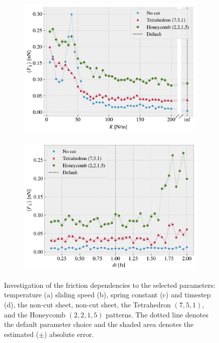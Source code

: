 \begin{figure}[!htb]
\begin{subfigure}[t]{0.49\textwidth}
      \centering
      \includegraphics[width=\textwidth]{figures/baseline/variables_spring_mean_fixmove.pdf}
      \caption{}
      \label{fig:var_K}
    \end{subfigure}
    \hfill
    \begin{subfigure}[t]{0.49\textwidth}
        \centering
        \includegraphics[width=\textwidth]{figures/baseline/variables_dt_mean_fixmove.pdf}
        \caption{}
        \label{fig:var_dt}
    \end{subfigure}
    \hfill
    \caption{Investigation of the friction dependencies to the selected parameters: temperature (a) sliding speed (b), spring constant (c) and timestep (d), the non-cut sheet, non-cut sheet, the Tetrahedron $(7,5,1)$, and the Honeycomb $(2,2,1,5)$ patterns. The dotted line denotes the default parameter choice and the shaded area denotes the estimated ($\pm$) absolute error.}
    \label{fig:main_param}
\end{figure}

